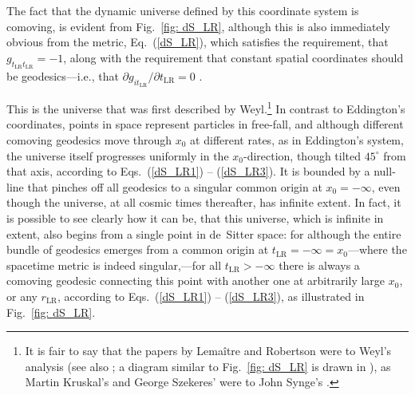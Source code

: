 The fact that the dynamic universe defined by this coordinate system is comoving, is evident from Fig.~\ref{fig: dS_LR}, although this is also immediately obvious from the metric, Eq.~(\ref{dS_LR}), which satisfies the requirement, that $g_{t_{\mathrm{LR}}t_{\mathrm{LR}}}=-1$, along with the requirement that constant spatial coordinates should be geodesics---i.e., that $\partial{g_{it_{\mathrm{LR}}}}/\partial{t_{\mathrm{LR}}}=0$ \cite{Weinberg1972}.

This is the universe that was first described by Weyl.\footnote{It is fair to say that the papers by Lema\^{i}tre \cite{Lemaitre1925b} and Robertson \cite{Robertson1928} were to Weyl's analysis \cite{Weyl1923a,Weyl1923,Weyl2009,Weyl1924,Weyl1930} (see also \cite{Ehlers2009}; a diagram similar to Fig.~\ref{fig: dS_LR} is drawn in \cite{Weyl1924}), as Martin Kruskal's \cite{Kruskal1960} and George Szekeres' \cite{Szekeres1960,Szekeres2002b} were to John Synge's \cite{Synge1950}.} In contrast to Eddington's coordinates, points in space represent particles in free-fall, and although different comoving geodesics move through $x_0$ at different rates, as in Eddington's system, the universe itself progresses uniformly in the $x_0$-direction, though tilted $45^{\circ}$ from that axis, according to Eqs.~(\ref{dS_LR1}) -- (\ref{dS_LR3}). It is bounded by a null-line that pinches off all geodesics to a singular common origin at $x_0=-\infty$, even though the universe, at all cosmic times thereafter, has infinite extent. In fact, it is possible to see clearly how it can be, that this universe, which is infinite in extent, also begins from a single point in de~Sitter space: for although the entire bundle of geodesics emerges from a common origin at $t_{\mathrm{LR}}=-\infty=x_0$---where the spacetime metric is indeed singular,---for all $t_{\mathrm{LR}}>-\infty$ there is always a comoving geodesic connecting this point with another one at arbitrarily large $x_0$, or any $r_{\mathrm{LR}}$, according to Eqs.~(\ref{dS_LR1}) -- (\ref{dS_LR3}), as illustrated in Fig.~\ref{fig: dS_LR}.

